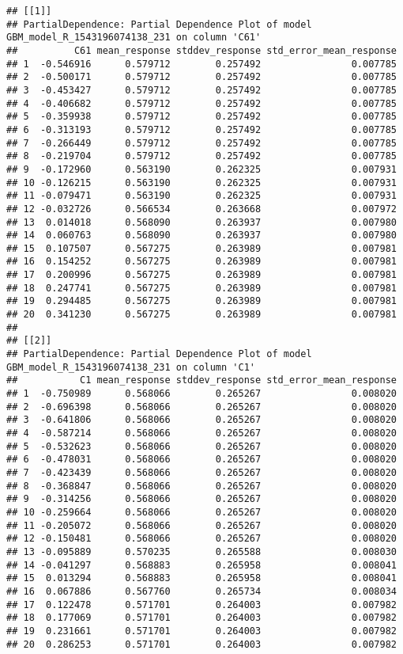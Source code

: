 \documentclass[]{article}
\begin{document}
\begin{verbatim}
## [[1]]
## PartialDependence: Partial Dependence Plot of model GBM_model_R_1543196074138_231 on column 'C61'
##          C61 mean_response stddev_response std_error_mean_response
## 1  -0.546916      0.579712        0.257492                0.007785
## 2  -0.500171      0.579712        0.257492                0.007785
## 3  -0.453427      0.579712        0.257492                0.007785
## 4  -0.406682      0.579712        0.257492                0.007785
## 5  -0.359938      0.579712        0.257492                0.007785
## 6  -0.313193      0.579712        0.257492                0.007785
## 7  -0.266449      0.579712        0.257492                0.007785
## 8  -0.219704      0.579712        0.257492                0.007785
## 9  -0.172960      0.563190        0.262325                0.007931
## 10 -0.126215      0.563190        0.262325                0.007931
## 11 -0.079471      0.563190        0.262325                0.007931
## 12 -0.032726      0.566534        0.263668                0.007972
## 13  0.014018      0.568090        0.263937                0.007980
## 14  0.060763      0.568090        0.263937                0.007980
## 15  0.107507      0.567275        0.263989                0.007981
## 16  0.154252      0.567275        0.263989                0.007981
## 17  0.200996      0.567275        0.263989                0.007981
## 18  0.247741      0.567275        0.263989                0.007981
## 19  0.294485      0.567275        0.263989                0.007981
## 20  0.341230      0.567275        0.263989                0.007981
## 
## [[2]]
## PartialDependence: Partial Dependence Plot of model GBM_model_R_1543196074138_231 on column 'C1'
##           C1 mean_response stddev_response std_error_mean_response
## 1  -0.750989      0.568066        0.265267                0.008020
## 2  -0.696398      0.568066        0.265267                0.008020
## 3  -0.641806      0.568066        0.265267                0.008020
## 4  -0.587214      0.568066        0.265267                0.008020
## 5  -0.532623      0.568066        0.265267                0.008020
## 6  -0.478031      0.568066        0.265267                0.008020
## 7  -0.423439      0.568066        0.265267                0.008020
## 8  -0.368847      0.568066        0.265267                0.008020
## 9  -0.314256      0.568066        0.265267                0.008020
## 10 -0.259664      0.568066        0.265267                0.008020
## 11 -0.205072      0.568066        0.265267                0.008020
## 12 -0.150481      0.568066        0.265267                0.008020
## 13 -0.095889      0.570235        0.265588                0.008030
## 14 -0.041297      0.568883        0.265958                0.008041
## 15  0.013294      0.568883        0.265958                0.008041
## 16  0.067886      0.567760        0.265734                0.008034
## 17  0.122478      0.571701        0.264003                0.007982
## 18  0.177069      0.571701        0.264003                0.007982
## 19  0.231661      0.571701        0.264003                0.007982
## 20  0.286253      0.571701        0.264003                0.007982
\end{verbatim}
\end{document}
